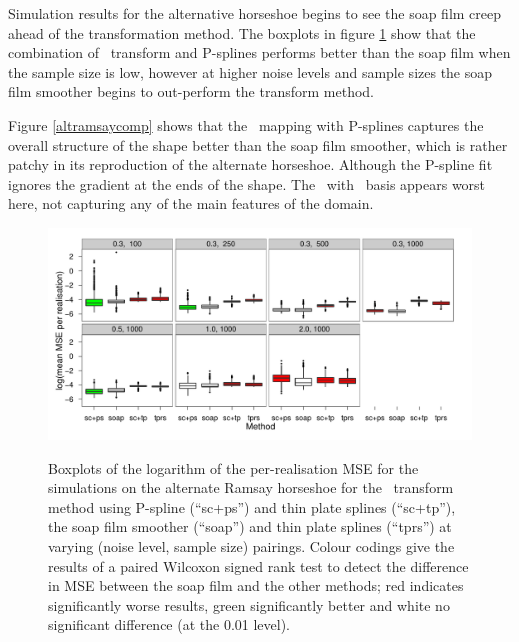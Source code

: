 Simulation results for the alternative horseshoe begins to see the soap film creep ahead of the transformation method. The boxplots in figure \ref{sc-altram-boxplot} show that the combination of \sch\ transform and P-splines performs better than the soap film when the sample size is low, however at higher noise levels and sample sizes the soap film smoother begins to out-perform the transform method.

Figure \ref{altramsaycomp} shows that the \sch\ mapping with P-splines captures the overall structure of the shape better than the soap film smoother, which is rather patchy in its reproduction of the alternate horseshoe. Although the P-spline fit ignores the gradient at the ends of the shape. The \sch\ with \tprs\ basis appears worst here, not capturing any of the main features of the domain.

\begin{figure}
\centering
\includegraphics{sc/tablecode/altramsay-boxplot.pdf} \\
\caption{Boxplots of the logarithm of the per-realisation MSE for the simulations on the alternate Ramsay horseshoe for the \sch\ transform method using P-spline (``sc+ps'') and thin plate splines (``sc+tp''), the soap film smoother (``soap'') and thin plate splines (``tprs'') at varying (noise level, sample size) pairings. Colour codings give the results of a paired Wilcoxon signed rank test to detect the difference in MSE between the soap film and the other methods; red indicates significantly worse results, green significantly better and white no significant difference (at the 0.01 level).}
\label{sc-altram-boxplot}
\end{figure}


